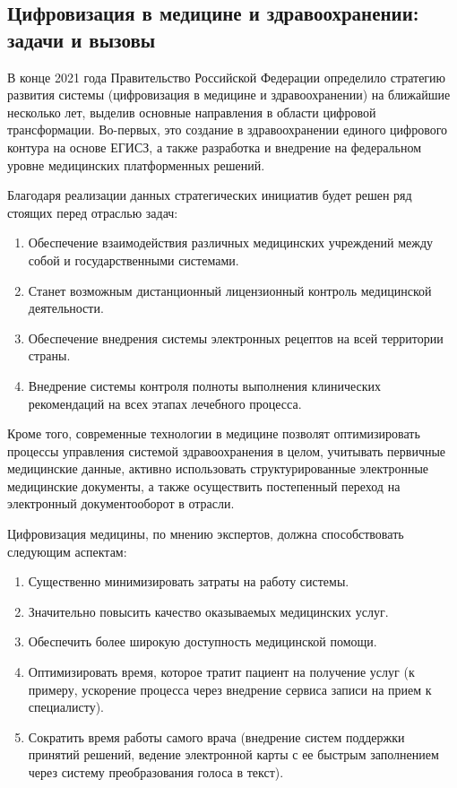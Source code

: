 \subsection{Цифровизация в медицине и здравоохранении: задачи и вызовы}

В конце 2021 года Правительство Российской Федерации определило стратегию развития системы (цифровизация в медицине и здравоохранении) на ближайшие несколько лет, выделив основные направления в области цифровой трансформации. Во-первых, это создание в здравоохранении единого цифрового контура на основе ЕГИСЗ, а также разработка и внедрение на федеральном уровне медицинских платформенных решений.

Благодаря реализации данных стратегических инициатив будет решен ряд стоящих перед отраслью задач:

\begin{enumerate}
	\item Обеспечение взаимодействия различных медицинских учреждений между собой и государственными системами.
	\item Станет возможным дистанционный лицензионный контроль медицинской деятельности.
	\item Обеспечение внедрения системы электронных рецептов на всей территории страны.
	\item Внедрение системы контроля полноты выполнения клинических рекомендаций на всех этапах лечебного процесса.
\end{enumerate}

Кроме того, современные технологии в медицине позволят оптимизировать процессы управления системой здравоохранения в целом, учитывать первичные медицинские данные, активно использовать структурированные электронные медицинские документы, а также осуществить постепенный переход на электронный документооборот в отрасли.

Цифровизация медицины, по мнению экспертов, должна способствовать следующим аспектам:

\begin{enumerate}
	\item Существенно минимизировать затраты на работу системы.
	\item Значительно повысить качество оказываемых медицинских услуг.
	\item Обеспечить более широкую доступность медицинской помощи.
	\item Оптимизировать время, которое тратит пациент на получение услуг (к примеру, ускорение процесса через внедрение сервиса записи на прием к специалисту).
	\item Сократить время работы самого врача (внедрение систем поддержки принятий решений, ведение электронной карты с ее быстрым заполнением через систему преобразования голоса в текст).
\end{enumerate}


